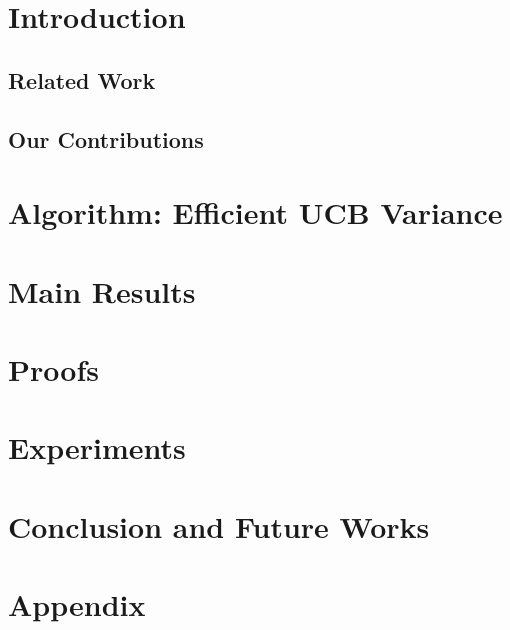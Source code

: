 \documentclass[letterpaper]{article} %
\begin{document}
\section{Introduction}
\label{sec:intro}


\subsection{Related Work}
\label{sec:related}



\subsection{Our Contributions}
\label{sec:contri}


\section{Algorithm: Efficient UCB Variance}
\label{sec:eucbv}


\section{Main Results} 
\label{sec:results}


\section{Proofs}
\label{sec:proofTheorem}


\section{Experiments}
\label{sec:expt}


\section{Conclusion and Future Works}
\label{sec:conc}



\clearpage
\newpage






\clearpage
\newpage


\section{Appendix}
\label{sec:app}

\end{document}
